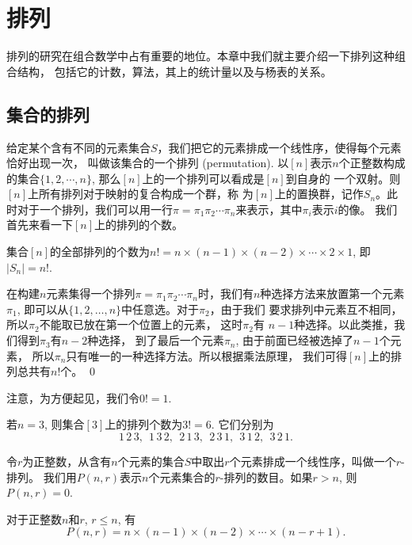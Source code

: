 \chapter{排列}

排列的研究在组合数学中占有重要的地位。本章中我们就主要介绍一下排列这种组合结构，
包括它的计数，算法，其上的统计量以及与杨表的关系。

\section{集合的排列}%

给定某个含有不同的元素集合$S$，我们把它的元素排成一个线性序，使得每个元素恰好出现一次，
叫做该集合的一个排列 (permutation). 以$[n]$表示$n$个正整数构成的集合$\{1,2,\cdots,n\}$, 那么$[n]$上的一个排列可以看成是$[n]$到自身的
一个双射。则$[n]$上所有排列对于映射的复合构成一个群，称
为$[n]$上的置换群，记作$S_n$。此时对于一个排列，我们可以用一行$\pi=\pi_1\pi_2
\cdots \pi_n$来表示，其中$\pi_i$表示$i$的像。
我们首先来看一下$[n]$上的排列的个数。

\begin{thm}\label{perT1}
集合$[n]$的全部排列的个数为$n!=n\times (n-1) \times (n-2)\times \cdots \times 2\times 1$, 即$|S_n|=n!$.
\end{thm}

\pf 在构建$n$元素集得一个排列$\pi=\pi_1\pi_2 \cdots
\pi_n$时，我们有$n$种选择方法来放置第一个元素$\pi_1$,
即可以从$\{1,2,\ldots,n\}$中任意选。对于$\pi_2$，由于我们
要求排列中元素互不相同，所以$\pi_2$不能取已放在第一个位置上的元素，
这时$\pi_2$有 $n-1$种选择。以此类推，我们得到$\pi_3$有$n-2$种选择，
到了最后一个元素$\pi_n$, 由于前面已经被选掉了$n-1$个元素，
所以$\pi_n$只有唯一的一种选择方法。所以根据乘法原理，
我们可得$[n]$上的排列总共有$n!$个。 \qed


注意，为方便起见，我们令$0!=1$.

\begin{exa}
若$n=3$, 则集合$[3]$上的排列个数为$3!=6$. 它们分别为
\[ 1\,2\,3,~~ 1\,3\,2,~~2\,1\,3,~~2\,3\,1,~~ 3\,1\,2,~~ 3\,2\,1.\]
\end{exa}

令$r$为正整数，从含有$n$个元素的集合$S$中取出$r$个元素排成一个线性序，叫做一个$r$-排列。
我们用$P(n,r)$表示$n$个元素集合的$r$-排列的数目。如果$r>n$, 则$P(n,r)=0$.

\begin{thm}
对于正整数$n$和$r$, $r\leq n$, 有
\[ P(n,r)=n\times (n-1) \times (n-2)\times \cdots \times (n-r+1).\]
\end{thm}

